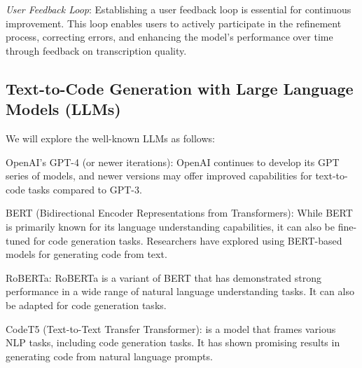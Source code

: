 {\em User Feedback Loop}: Establishing a user feedback loop is essential for
continuous improvement. This loop enables users to actively
participate in the refinement process, correcting errors, and
enhancing the model's performance over time through feedback on
transcription quality.


\subsection{Text-to-Code Generation with Large Language Models (LLMs)}



We will explore the well-known LLMs as follows:

OpenAI's GPT-4 (or newer iterations): OpenAI continues to develop its GPT series of models, and newer versions may offer improved capabilities for text-to-code tasks compared to GPT-3.

BERT (Bidirectional Encoder Representations from Transformers): While BERT is primarily known for its language understanding capabilities, it can also be fine-tuned for code generation tasks. Researchers have explored using BERT-based models for generating code from text.

RoBERTa: RoBERTa is a variant of BERT that has demonstrated strong performance in a wide range of natural language understanding tasks. It can also be adapted for code generation tasks.

CodeT5 (Text-to-Text Transfer Transformer): is a model that frames various NLP tasks, including code generation tasks. It has shown promising results in generating code from natural language prompts.


